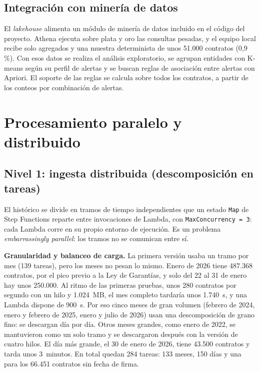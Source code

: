 \documentclass[conference]{IEEEtran}
\begin{document}
\subsection{Integración con minería de datos}
El \textit{lakehouse} alimenta un módulo de minería de datos incluido en el código del proyecto. Athena ejecuta sobre plata y oro las consultas pesadas, y el equipo local recibe solo agregados y una muestra determinista de unos 51.000 contratos (0,9\,\%). Con esos datos se realiza el análisis exploratorio, se agrupan entidades con K-means según su perfil de alertas y se buscan reglas de asociación entre alertas con Apriori. El soporte de las reglas se calcula sobre todos los contratos, a partir de los conteos por combinación de alertas.

\section{Procesamiento paralelo y distribuido}

\subsection{Nivel 1: ingesta distribuida (descomposición en tareas)}
El histórico se divide en tramos de tiempo independientes que un estado \texttt{Map} de Step Functions reparte entre invocaciones de Lambda, con \texttt{MaxConcurrency = 3}: cada Lambda corre en su propio entorno de ejecución. Es un problema \emph{embarrassingly parallel}: los tramos no se comunican entre sí.

\textbf{Granularidad y balanceo de carga.} La primera versión usaba un tramo por mes (139 tareas), pero los meses no pesan lo mismo. Enero de 2026 tiene 487.368 contratos, por el pico previo a la Ley de Garantías, y solo del 22 al 31 de enero hay unos 250.000. Al ritmo de las primeras pruebas, unos 280 contratos por segundo con un hilo y 1.024~MB, el mes completo tardaría unos 1.740~s, y una Lambda dispone de 900~s. Por eso cinco meses de gran volumen (febrero de 2024, enero y febrero de 2025, enero y julio de 2026) usan una descomposición de grano fino: se descargan día por día. Otros meses grandes, como enero de 2022, se mantuvieron como un solo tramo y se descargaron después con la versión de cuatro hilos. El día más grande, el 30 de enero de 2026, tiene 43.500 contratos y tarda unos 3~minutos. En total quedan 284 tareas: 133 meses, 150 días y una para los 66.451 contratos sin fecha de firma.
\end{document}
